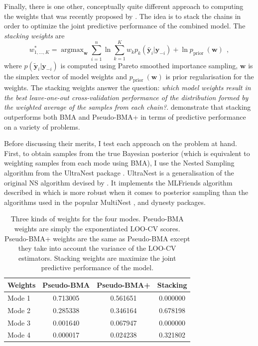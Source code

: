 \documentclass[12pt,dvipsnames]{report}
\newcommand{\ssf}[1]{\textsf{#1}}
\renewcommand{\vec}[1]{\boldsymbol{\mathbf{#1}}}
\newcommand{\hquad}{~~}
\begin{document}
Finally, there is one other, conceptually quite different approach to computing the weights 
that was recently proposed by 
\citet{arXiv:2006.12335}. The idea is to stack the chains in order to optimize the joint 
predictive performance of the combined model. The \emph{stacking weights} are 
\begin{equation}
w_{1, \ldots, K}^*=\operatorname{argmax}_{\vec{w}} \sum_{i=1}^n \ln\sum_{k=1}^K w_k p_k\left(\tilde{\vec y_i} |\vec y_{-i}\right)+\ln p_{\text {prior }}(\mathbf{w})
\hquad,
\label{eq:stacking_weights}
\end{equation}
where $p(\tilde{\vec y}_{i}|\vec y_{-i})$ is computed using Pareto smoothed importance 
sampling, $\vec w$ is the simplex vector of model weights and 
$p_{\text {prior }}(\mathbf{w})$ is prior regularisation for the weights.
The stacking weights answer the question: \emph{which model weights result in 
the best leave-one-out cross-validation performance of the distribution formed by 
the weighted average of the samples from each chain?}. \citet{arXiv:2006.12335} demonstrate
that stacking outperforms both BMA and Pseudo-BMA+ in terms of predictive performance 
on a variety of problems.

Before discussing their merits, I test each approach on the problem at hand. First, 
to obtain samples from the true Bayesian posterior (which is equivalent to weighting 
samples from each mode using BMA), I use the Nested Sampling algorithm 
from the \ssf{UltraNest} package \citep{2021JOSS....6.3001B}. \ssf{UltraNest} is a 
generalisation of the original NS algorithm devised by \citet{2004AIPC..735..395S}.
It implements the \ssf{MLFriends} algorithm described in 
\citet{2016S&C....26..383B,10.2307/26874452}
which is more robust when it comes to posterior sampling than 
the algorithms used in the popular \ssf{MultiNest} \citep{2009MNRAS.398.1601F},
and \ssf{dynesty} \citep{2020MNRAS.493.3132S} packages.


\begin{table}[h!]
\centering
\begin{tabular}{l c c c} 
 \toprule
Weights & Pseudo-BMA &  Pseudo-BMA+ & Stacking\\
 \midrule
 Mode 1 &  0.713005 &  0.561651 &  0.000000\\
 Mode 2 & 0.285338 & 0.346164 &  0.678198\\
 Mode 3 & 0.001640 & 0.067947 & 0.000000\\
 Mode 4 & 0.000017 & 0.024238 & 0.321802\\
\bottomrule
\end{tabular}
\caption{Three kinds of weights for the four modes. Pseudo-BMA weights are simply 
the exponentiated LOO-CV scores. Pseudo-BMA+ weights are the same as Pseudo-BMA 
except they take into account the variance of the LOO-CV estimators. Stacking weights 
are  maximize the joint predictive performance of the model.}
\label{tab:weights}
\end{table}
\end{document}
